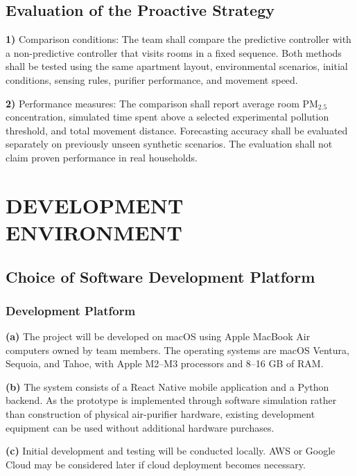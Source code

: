\documentclass[conference]{IEEEtran}
\begin{document}
\subsection{Evaluation of the Proactive Strategy}
\par\noindent\textbf{1)} Comparison conditions:
The team shall compare the predictive controller with a non-predictive controller that visits rooms in a fixed sequence. Both methods shall be tested using the same apartment layout, environmental scenarios, initial conditions, sensing rules, purifier performance, and movement speed.

\par\noindent\textbf{2)} Performance measures:
The comparison shall report average room PM$_{2.5}$ concentration, simulated time spent above a selected experimental pollution threshold, and total movement distance. Forecasting accuracy shall be evaluated separately on previously unseen synthetic scenarios. The evaluation shall not claim proven performance in real households.

\section{DEVELOPMENT ENVIRONMENT}
\subsection{Choice of Software Development Platform}
\subsubsection{Development Platform}
\par\noindent\textbf{(a)} The project will be developed on macOS using Apple MacBook Air computers owned by team members. The operating systems are macOS Ventura, Sequoia, and Tahoe, with Apple M2--M3 processors and 8--16 GB of RAM.
\par\noindent\textbf{(b)} The system consists of a React Native mobile application and a Python backend. As the prototype is implemented through software simulation rather than construction of physical air-purifier hardware, existing development equipment can be used without additional hardware purchases.
\par\noindent\textbf{(c)} Initial development and testing will be conducted locally. AWS or Google Cloud may be considered later if cloud deployment becomes necessary.
\end{document}
